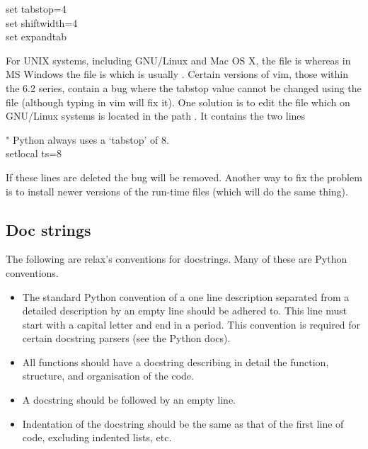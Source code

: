 \begin{exampleenv}
set tabstop=4 \\
set shiftwidth=4 \\
set expandtab
\end{exampleenv}

For UNIX systems, including GNU/Linux and Mac OS X, the  file is  whereas in MS Windows the file is  which is usually .
Certain versions of vim, those within the 6.2 series, contain a bug where the tabstop value cannot be changed using the  file (although typing  in vim will fix it).
One solution is to edit the file  which on GNU/Linux systems is located in the path .
It contains the two lines

\begin{exampleenv}
" Python always uses a `tabstop' of 8. \\
setlocal ts=8
\end{exampleenv}

If these lines are deleted the bug will be removed.
Another way to fix the problem is to install newer versions of the run-time files (which will do the same thing).



\subsection{Doc strings}

The following are relax's conventions for docstrings.
Many of these are Python conventions.
\begin{itemize}
  \item The standard Python convention of a one line description separated from a detailed description by an empty line should be adhered to.
    This line must start with a capital letter and end in a period.
    This convention is required for certain docstring parsers (see the Python docs).
  \item All functions should have a docstring describing in detail the function, structure, and organisation of the code.
  \item A docstring should be followed by an empty line.
  \item Indentation of the docstring should be the same as that of the first line of code, excluding indented lists, etc.
\end{itemize}

